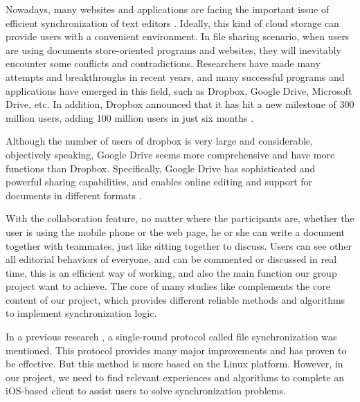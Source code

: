 \noindent Nowadays, many websites and applications are facing the important issue of efficient synchronization of text editors \citep{MOSCICKI20181052}. Ideally, this kind of cloud storage can provide users with a convenient environment. In file sharing scenario, when users are using documents store-oriented programs and websites, they will inevitably encounter some conflicts and contradictions. Researchers have made many attempts and breakthroughs in recent years, and many successful programs and applications have emerged in this field, such as Dropbox, Google Drive, Microsoft Drive, etc. In addition, Dropbox announced that it has hit a new milestone of 300 million users, adding 100 million users in just six months \citep{7417235}.


\vspace{0.3cm}
\noindent Although the number of users of dropbox is very large and considerable, objectively speaking, Google Drive seems more comprehensive and have more functions than Dropbox. Specifically, Google Drive has sophisticated and powerful sharing capabilities, and enables online editing and support for documents in different formats \citep{googledrive}.

\begin{comment}
Jakub T. Mo艣cicki, Luca Mascetti,
Cloud storage services for file synchronization and sharing in science, education and research,
Future Generation Computer Systems,
Volume 78, Part 3,
2018,
Pages 1052-1054,
ISSN 0167-739X,
https://doi.org/10.1016/j.future.2017.09.019.
\end{comment}

\vspace{0.3cm}
\noindent With the collaboration feature, no matter where the participants are, whether the user is using the mobile phone or the web page, he or she can write a document together with teammates, just like sitting together to discuss. Users can see other all editorial behaviors of everyone, and can be commented or discussed in real time, this is an efficient way of working, and also the main function our group project want to achieve. The core of many studies like \citep{parker2001method} complements the core content of our project, which provides different reliable methods and algorithms to implement synchronization logic.

\vspace{0.3cm}
\noindent In a previous research \citep{1498448}, a single-round protocol called file synchronization was mentioned. This protocol provides many major improvements and has proven to be effective. But this method is more based on the Linux platform. However, in our project, we need to find relevant experiences and algorithms to complete an iOS-based client to assist users to solve synchronization problems.


